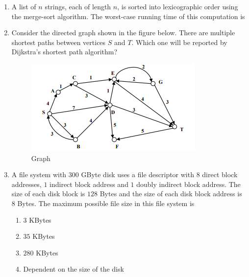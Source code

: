 \documentclass[journal]{IEEEtran}
\numberwithin{equation}{enumi}
\numberwithin{figure}{enumi}
\begin{document}
\begin{enumerate}
\item A list of $n$ strings, each of length $n$, is sorted into lexicographic order using the merge-sort algorithm. The worst-case running time of this computation is

\begin{enumerate}
\end{enumerate}

\item Consider the directed graph shown in the figure below.  
There are multiple shortest paths between vertices $S$ and $T$. Which one will be reported by Dijkstra's shortest path algorithm?
\begin{figure}[H]
    \centering
    \includegraphics[width=0.5\columnwidth]{figs/New folder (2)/fig12.png}
    \caption{Graph}
    \label{fig:12}
   \end{figure}
\begin{enumerate}
\end{enumerate}

\item A file system with $300$ GByte disk uses a file descriptor with $8$ direct block addresses, $1$ indirect block address and $1$ doubly indirect block address. The size of each disk block is $128$ Bytes and the size of each disk block address is $8$ Bytes. The maximum possible file size in this file system is

\begin{enumerate}
    \item $3$ KBytes
    \item $35$ KBytes
    \item $280$ KBytes
    \item Dependent on the size of the disk
\end{enumerate}


\end{enumerate}
\end{document}
